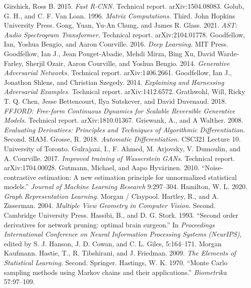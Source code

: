  Girshick, Ross B. 2015. \emph{Fast R-CNN.} Technical report. arXiv:1504.08083.
 Golub, G. H., and C. F. Van Loan. 1996. \emph{Matrix Computations.} Third. John Hopkins University Press.
 Gong, Yuan, Yu-An Chung, and James R. Glass. 2021. \emph{AST: Audio Spectrogram Transformer.} Technical report. arXiv:2104.01778.
 Goodfellow, Ian, Yoshua Bengio, and Aaron Courville. 2016. \emph{Deep Learning.} MIT Press.
 Goodfellow, Ian J., Jean Pouget-Abadie, Mehdi Mirza, Bing Xu, David Warde-Farley, Sherjil Ozair, Aaron Courville, and Yoshua Bengio. 2014. \emph{Generative Adversarial Networks.} Technical report. arXiv:1406.2661.
 Goodfellow, Ian J., Jonathon Shlens, and Christian Szegedy. 2014. \emph{Explaining and Harnessing Adversarial Examples.} Technical report. arXiv:1412.6572.
 Grathwohl, Will, Ricky T. Q. Chen, Jesse Bettencourt, Ilya Sutskever, and David Duvenaud. 2018. \emph{FFJORD: Free-form Continuous Dynamics for Scalable Reversible Generative Models.} Technical report. arXiv:1810.01367.
 Griewank, A., and A Walther. 2008. \emph{Evaluating Derivatives: Principles and Techniques of Algorithmic Differentiation.} Second. SIAM.
 Grosse, R. 2018. \emph{Automatic Differentiation.} CSC321 Lecture 10. University of Toronto.
 Gulrajani, I., F. Ahmed, M. Arjovsky, V. Dumoulin, and A. Courville. 2017. \emph{Improved training of Wasserstein GANs.} Technical report. arXiv:1704.00028.
 Gutmann, Michael, and Aapo Hyv\"arinen. 2010. ``Noise-contrastive estimation: A new estimation principle for unnormalized statistical models.'' \emph{Journal of Machine Learning Research} 9:297--304.
 Hamilton, W. L. 2020. \emph{Graph Representation Learning.} Morgan / Claypool.
 Hartley, R., and A. Zisserman. 2004. \emph{Multiple View Geometry in Computer Vision.} Second. Cambridge University Press.
 Hassibi, B., and D. G. Stork. 1993. ``Second order derivatives for network pruning: optimal brain surgeon.'' In \emph{Proceedings International Conference on Neural Information Processing Systems (NeurIPS)}, edited by S. J. Hanson, J. D. Cowan, and C. L. Giles, 5:164--171. Morgan Kaufmann.
 Hastie, T., R. Tibshirani, and J. Friedman. 2009. \emph{The Elements of Statistical Learning.} Second. Springer.
 Hastings, W. K. 1970. ``Monte Carlo sampling methods using Markov chains and their applications.'' \emph{Biometrika} 57:97--109.
